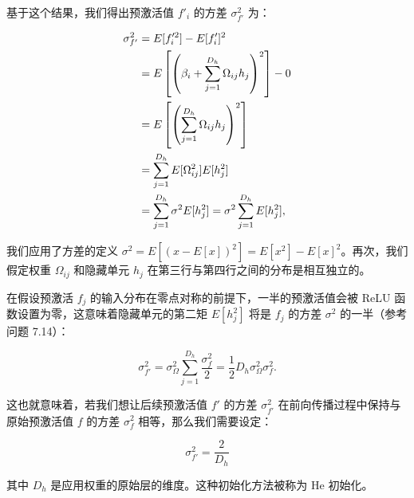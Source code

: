 基于这个结果，我们得出预激活值 \(f'_i\) 的方差 \(\sigma_{f'}^2\) 为：



\begin{align}
\sigma_{f'}^2 &= E[f_i'^2] - E[f_i']^2 \notag \\
&= E\left[\left(\beta_i + \sum_{j=1}^{D_h} \Omega_{ij}h_j \right)^2\right] - 0 \notag \\
&= E\left[\left( \sum_{j=1}^{D_h} \Omega_{ij}h_j \right)^2\right] \notag \\
&= \sum_{j=1}^{D_h} E[\Omega_{ij}^2] E[h_j^2] \notag \\
&= \sum_{j=1}^{D_h} \sigma^2 E[h_j^2] = \sigma^2 \sum_{j=1}^{D_h} E[h_j^2], 
\end{align} 


我们应用了方差的定义 \(\sigma^2 = E[(x - E[x])^2] = E[x^2] - E[x]^2\)。再次，我们假定权重 \(\Omega_{ij}\) 和隐藏单元 \(h_j\) 在第三行与第四行之间的分布是相互独立的。

在假设预激活 \(f_j\) 的输入分布在零点对称的前提下，一半的预激活值会被 ReLU 函数设置为零，这意味着隐藏单元的第二矩 \(E[h_j^2]\) 将是 \(f_j\) 的方差 \(\sigma^2\) 的一半（参考问题 7.14）：


\begin{equation}
\sigma_{f'}^2 = \sigma_\Omega^2 \sum_{j=1}^{D_h} \frac{\sigma_f^2}{2} = \frac{1}{2} D_h\sigma_\Omega^2\sigma_f^2. 
\end{equation}

这也就意味着，若我们想让后续预激活值 \(f'\) 的方差 \(\sigma_{f'}^2\) 在前向传播过程中保持与原始预激活值 \(f\) 的方差 \(\sigma_f^2\) 相等，那么我们需要设定：


\begin{equation}
\sigma_{f'}^2 = \frac{2}{D_h} 
\end{equation}

其中 \(D_h\) 是应用权重的原始层的维度。这种初始化方法被称为 He 初始化。

